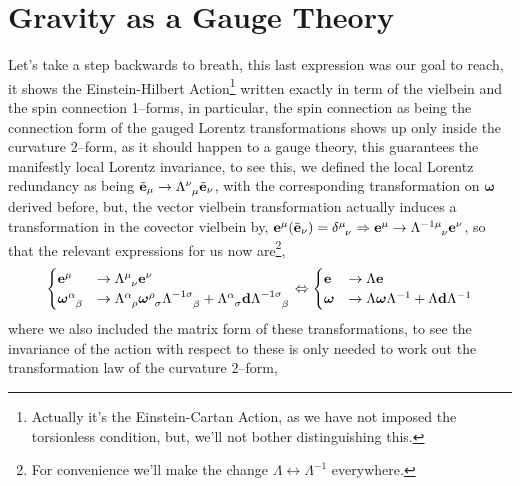 \section{Gravity as a Gauge Theory}

Let's take a step backwards to breath, this last expression was our goal to reach, it shows the Einstein-Hilbert Action\footnote{Actually it's the Einstein-Cartan Action, as we have not imposed the torsionless condition, but, we'll not bother distinguishing this.} 
written exactly in term of the vielbein and the spin connection 1--forms, in particular, the spin connection as being the connection form of the gauged Lorentz transformations shows up only inside the curvature 2--form, as 
it should happen to a gauge theory, this guarantees the manifestly local Lorentz invariance, to see this, we defined the local Lorentz redundancy as being $\tilde{\vb e}_\mu\rightarrow \tensor{\Lambda}{^\nu_\mu}\tilde{\vb e}_\nu$, with the corresponding 
transformation on $\boldsymbol\omega$ derived before, but, the vector vielbein transformation actually induces a transformation in the covector vielbein by, $\vb e^\mu\qty(\tilde{\vb e}_\nu)=\tensor{\delta}{^\mu_\nu}\Rightarrow \vb e^\mu\rightarrow \tensor{\Lambda}{^{-1}^\mu_\nu}\vb e^\nu$, so that the 
relevant expressions for us now are\footnote{For convenience we'll make the change $\Lambda\leftrightarrow\Lambda^{-1}$ everywhere.},
\begin{align*}
    \begin{cases}
        \vb e^\mu&\rightarrow\tensor{\Lambda}{^\mu_\nu}\vb e^\nu\\
        \tensor{\boldsymbol\omega}{^\alpha_\beta}&\rightarrow\tensor{\Lambda}{^\alpha_\rho}\tensor{\boldsymbol\omega}{^\rho_\sigma}\tensor{\Lambda}{^{-1}^\sigma_\beta}+\tensor{\Lambda}{^\alpha_\sigma}\vb d\tensor{\Lambda}{^{-1}^\sigma_\beta}
    \end{cases}\Leftrightarrow\begin{cases}
        \vb e&\rightarrow\Lambda\vb e\\
        \boldsymbol\omega&\rightarrow\Lambda\boldsymbol\omega\Lambda^{-1}+\Lambda\vb d\Lambda^{-1}
    \end{cases} 
\end{align*}
where we also included the matrix form of these transformations, to see the invariance of the action with respect to these is only needed to work out the transformation law of the curvature 2--form,
